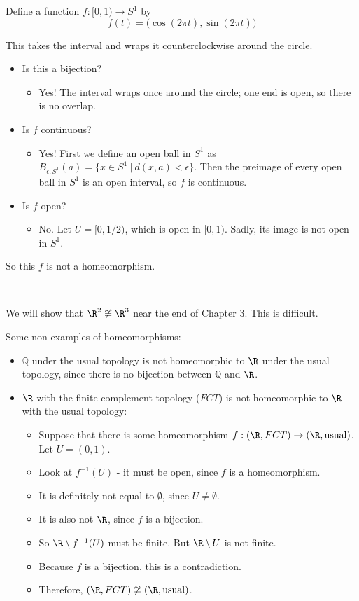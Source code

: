 \begin{example}
 Define a function $f:[0,1)\to S^1$ by
\[ f(t) = \big( \cos(2\pi t), \sin(2\pi t)\big) \]
\end{example}
This takes the interval and wraps it counterclockwise around the circle.
\begin{itemize}
\item Is this a bijection?
\begin{itemize}
\item Yes!  The interval wraps once around the circle; one end is open, so there is no overlap.
\end{itemize}

\item Is $f$ continuous?
\begin{itemize}
\item Yes!  First we define an open ball in $S^1$ as $B_{\epsilon, S^1}(a) = \{x\in S^1\ |\ d(x,a) < \epsilon\}$.  Then the preimage of every open ball in $S^1$ is an open interval, so $f$ is continuous.  
\end{itemize}


\item Is $f$ open?
\begin{itemize}
\item No.  Let $U = [0, 1/2)$, which is open in $[0,1)$.  Sadly, its image is not open in $S^1$.
\end{itemize}

\end{itemize}
So this $f$ is not a homeomorphism.

\mbox{ }

We will show that $\R^2 \not\cong \R^3$ near the end of Chapter 3. This is difficult.

\begin{example}Some non-examples of homeomorphisms:\end{example}
\begin{itemize}
\item $\mathbb Q$ under the usual topology is not homeomorphic to $\R$ under the usual topology, since there is no bijection between $\mathbb Q$ and $\R$.
\item $\R$ with the finite-complement topology ($FCT$) is not homeomorphic to $\R$ with the usual topology:
\begin{itemize}
\item Suppose that there is some homeomorphism $f:(\R, FCT)\to(\R,\text{usual})$.  Let $U = (0,1)$.
\item Look at $f^{-1}(U)$ - it must be open, since $f$ is a homeomorphism.
\item It is definitely not equal to $\emptyset$, since $U\ne\emptyset$.
\item It is also not $\R$, since $f$ is a bijection.
\item So $\R\setminus f^{-1}(U)$ must be finite.  But $\R\setminus U$ is not finite.
\item Because $f$ is a bijection, this is a contradiction.
\item Therefore, $(\R, FCT) \not\cong (\R, \text{usual})$.
\end{itemize}
\end{itemize}
